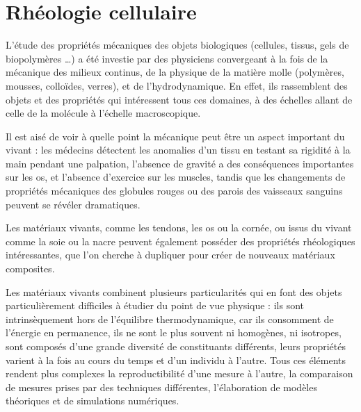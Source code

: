 %
%
%

\chapter{Rhéologie cellulaire}

L'étude des propriétés mécaniques des objets biologiques (cellules, tissus, gels de biopolymères \dots) a été investie par des physiciens convergeant à la fois de la mécanique des milieux continus, de la physique de la matière molle (polymères, mousses, colloïdes, verres), et de l'hydrodynamique. 
En effet, ils rassemblent des objets et des propriétés qui intéressent tous ces domaines, à des échelles allant de celle de la molécule à l'échelle macroscopique. 

Il est aisé de voir à quelle point la mécanique peut être un aspect important du vivant : les médecins détectent les anomalies d'un tissu en testant sa rigidité \og à la main \fg pendant une palpation, l'absence de gravité a des conséquences importantes sur les os, et l'absence d'exercice sur les muscles, tandis que les changements de propriétés mécaniques des globules rouges ou des parois des vaisseaux sanguins peuvent se révéler dramatiques. 

Les matériaux vivants, comme les tendons, les os ou la cornée, ou issus du vivant comme la soie ou la nacre peuvent également posséder des propriétés rhéologiques intéressantes, que l'on cherche à dupliquer pour créer de nouveaux matériaux composites. 

Les matériaux vivants combinent plusieurs particularités qui en font des objets particulièrement difficiles à étudier du point de vue physique : ils sont intrinsèquement hors de l'équilibre thermodynamique, car ils consomment de l'énergie en permanence, ils ne sont le plus souvent ni homogènes, ni isotropes, sont composés d'une grande diversité de constituants différents, leurs propriétés varient à la fois au cours du temps et d'un individu à l'autre. 
Tous ces éléments rendent plus complexes la reproductibilité d'une mesure à l'autre, la comparaison de mesures prises par des techniques différentes, l'élaboration de modèles théoriques et de simulations numériques.


